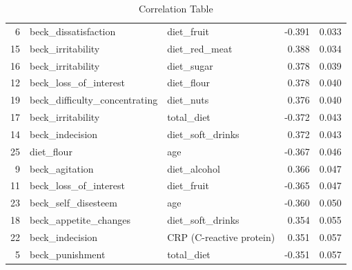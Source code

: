 \documentclass[jou]{apa7}
\begin{document}
\begin{table}[]
{\begin{tabular}{@{}rllrr@{}}
			6                    & beck\_dissatisfaction        & diet\_fruit               & -0.391                          & 0.033                        \\
			15                   & beck\_irritability           & diet\_red\_meat           & 0.388                           & 0.034                        \\
			16                   & beck\_irritability           & diet\_sugar               & 0.378                           & 0.039                        \\
			12                   & beck\_loss\_of\_interest     & diet\_flour               & 0.378                           & 0.040                        \\
			19                   & beck\_difficulty\_concentrating & diet\_nuts             & 0.376                           & 0.040                        \\
			17                   & beck\_irritability           & total\_diet               & -0.372                          & 0.043                        \\
			14                   & beck\_indecision             & diet\_soft\_drinks        & 0.372                           & 0.043                        \\
			25                   & diet\_flour                  & age                       & -0.367                          & 0.046                        \\
			9                    & beck\_agitation              & diet\_alcohol             & 0.366                           & 0.047                        \\
			11                   & beck\_loss\_of\_interest     & diet\_fruit               & -0.365                          & 0.047                        \\
			23                   & beck\_self\_disesteem        & age                       & -0.360                          & 0.050                        \\
			18                   & beck\_appetite\_changes      & diet\_soft\_drinks        & 0.354                           & 0.055                        \\
			22                   & beck\_indecision             & CRP (C-reactive protein)  & 0.351                           & 0.057                        \\
			5                    & beck\_punishment             & total\_diet               & -0.351                          & 0.057                        \\ \bottomrule
		\end{tabular}%
	}
	\caption{Correlation Table}
	\label{tab:tableOfCorr}
\end{table}
\end{document}
